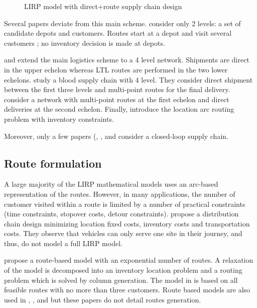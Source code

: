 \documentclass[a4paper,10pt]{article}
\begin{document}
\begin{linenumbers}
\begin{figure}[htbp]
	\centering
	\caption{LIRP model with direct+route supply chain design}
		\label{fig:directloop}
	\end{figure}

Several papers deviate from this main scheme.  \cite{Zhang2014} consider only 2 levels: a set of candidate depots and customers. Routes start at a depot and visit several customers ; no inventory decision is made at depots. 

\cite{AmbScu05} and \cite{Tavana2018} extend the main logistics scheme to a 4 level network. Shipments are direct in the upper echelon whereas LTL routes are performed in the two lower echelons. 
\cite{Eskandari2018} study a blood supply chain with 4 level. They consider direct shipment between the first three levels and multi-point routes for the final delivery. 
\cite{Bashiri2018} consider a network with multi-point routes at the first echelon and direct deliveries at the second echelon. 
Finally, \cite{Riquelme2016} introduce the location arc routing problem with inventory constraints. 

Moreover, only a few papers (\cite{LiuChenLiLiu2015}, \cite{Deng2016}, \cite{Zhalechian2016} and \cite{LiGuoWangFu2013} 
consider a closed-loop supply chain. 


\subsection{Route formulation}
\label{sec:r}

A large majority of the LIRP mathematical models uses an arc-based representation of the routes. 
However, in many applications, the number of customer visited within a route is limited by a number of practical constraints (time constraints, stopover costs, detour constraints). \cite{MaDav05} propose a distribution chain design  minimizing location fixed costs, inventory costs and transportation costs. They observe that vehicles can only serve one site in their journey, and thus, do not model a full LIRP model. 

\cite{Guerrero2013} propose a route-based model with an exponential number of routes. A relaxation of the model is decomposed into an inventory location problem and a routing problem which is solved by column generation. 
The model in \cite{Lehrlaly2016} is based on all feasible routes with no more than three customers. 
Route based models are also used in \cite{LiGuoWangFu2013}, \cite{LiuChenLiLiu2015},  \cite{Deng2016} and \cite{hiassat_genetic_2017} 
but these papers do not detail routes generation.


\end{linenumbers}
\end{document}
